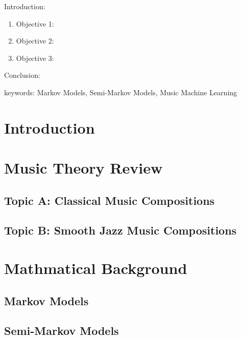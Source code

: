
\twocolumn
\scriptsize
\begin{frontmatter}
		\title{}
		\author{}
		\address{The Mathematical Learning Space}
\end{frontmatter}	

Introduction:
\begin{enumerate}
\item Objective 1:
\item Objective 2:
\item Objective 3:
\end{enumerate}
Conclusion:

keywords: Markov Models, Semi-Markov Models, Music Machine Learning

\section{Introduction}



\section{Music Theory Review}

\subsection{Topic A: Classical Music Compositions}

\subsection{Topic B: Smooth Jazz Music Compositions}

\section{Mathmatical Background}

\subsection{Markov Models}

\subsection{Semi-Markov Models}



